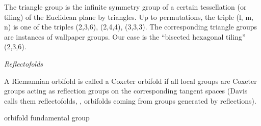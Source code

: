 \begin{description}
The triangle group is the infinite symmetry group of a certain
tessellation (or tiling) of the Euclidean plane by triangles. Up to
permutations, the triple (l, m, n) is one of the triples (2,3,6),
(2,4,4), (3,3,3). The corresponding triangle groups are instances of
wallpaper groups. Our case is the ``bisected hexagonal tiling'' (2,3,6).

%
{\em Reflectofolds}

%
A Riemannian orbifold is called a Coxeter orbifold if all local groups
are Coxeter groups acting as reflection groups on the corresponding
tangent spaces (Davis calls them reflectofolds,
\ie, orbifolds coming from groups generated by reflections).

%
orbifold fundamental group



\end{description}
